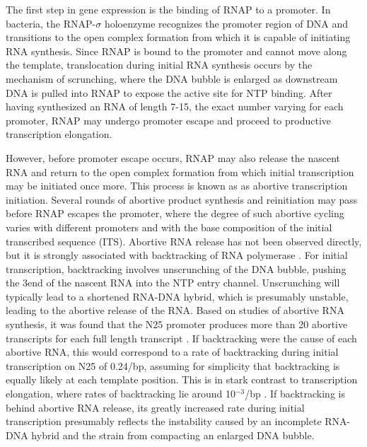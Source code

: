 %
The first step in gene expression is the binding of RNAP to a promoter. In
bacteria, the RNAP-$\sigma$ holoenzyme recognizes the promoter region of DNA
and transitions to the open complex formation from which it is capable of
initiating RNA synthesis. Since RNAP is bound to the promoter and cannot move
along the template, translocation during initial RNA synthesis occurs by the
mechanism of scrunching, where the DNA bubble is enlarged as downstream DNA is
pulled into RNAP to expose the active site for NTP binding. After having
synthesized an RNA of length 7-15, the exact number varying for each promoter,
RNAP may undergo promoter escape and proceed to productive transcription
elongation.

However, before promoter escape occurs, RNAP may also release the
nascent RNA and return to the open complex formation from which initial
transcription may be initiated once more. This process is known as as abortive
transcription initiation. Several rounds of abortive product synthesis and
reinitiation may pass before RNAP escapes the promoter, where the degree of
such abortive cycling varies with different promoters and with the base
composition of the initial transcribed sequence (ITS). Abortive RNA release
has not been observed directly, but it is strongly associated with
backtracking of RNA polymerase
\cite{hsu_escherichia_1995,feng_grea-induced_1994,hsu_initial_2006}. For
initial transcription, backtracking involves unscrunching of the DNA bubble,
pushing the 3\ppp end of the nascent RNA into the NTP entry channel.
Unscrunching will typically lead to a shortened RNA-DNA hybrid, which is
presumably unstable, leading to the abortive release of the RNA. Based on
studies of abortive RNA synthesis, it was found that the N25 promoter produces
more than 20 abortive transcripts for each full length transcript
\cite{hsu_initial_2006}. If backtracking were the cause of each abortive RNA,
this would correspond to a rate of backtracking during initial transcription
on N25 of 0.24/bp, assuming for simplicity that backtracking is equally
likely at each template position. This is in stark contrast to transcription
elongation, where rates of backtracking lie around 10$^{-3}$/bp
\cite{shaevitz_backtracking_2003}. If backtracking is behind abortive RNA
release, its greatly increased rate during initial transcription presumably
reflects the instability caused by an incomplete RNA-DNA hybrid and the strain
from compacting an enlarged DNA bubble.

